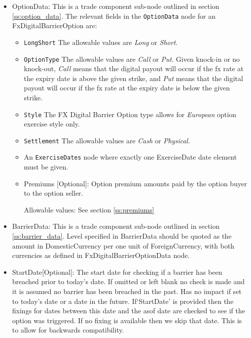 \begin{itemize}

\item OptionData: This is a trade component sub-node outlined in section \ref{ss:option_data}. 
The relevant fields in the \lstinline!OptionData! node for an FxDigitalBarrierOption are:

\begin{itemize}
\item \lstinline!LongShort! The allowable values are \emph{Long} or \emph{Short}.

\item \lstinline!OptionType! The allowable values are \emph{Call} or \emph{Put}. Given knock-in or no knock-out,  \emph{Call} means that the digital payout will occur if the fx rate at the expiry date is above the given strike, and \emph{Put} means that the digital payout will occur if the fx rate at the expiry date is below the given strike.

\item  \lstinline!Style! The FX Digital Barrier Option type allows for \emph{European} option exercise style only.

\item  \lstinline!Settlement! The allowable values are \emph{Cash} or \emph{Physical}.

\item An \lstinline!ExerciseDates! node where exactly one ExerciseDate date element must be given.

\item Premiums [Optional]: Option premium amounts paid by the option buyer to the option seller.

Allowable values:  See section \ref{ss:premiums}

\end{itemize}

\item BarrierData: This is a trade component sub-node outlined in section \ref{ss:barrier_data}.
Level specified in BarrierData should be quoted as the amount in DomesticCurrency per one unit of ForeignCurrency, with both currencies as defined in FxDigitalBarrierOptionData node.

\item StartDate[Optional]: The start date for checking if a barrier has been breached prior to today's date.  If omitted or left blank no check is made and it is assumed no barrier has been breached in the past. Has no impact if set to today's date or a date in the future. If`StartDate' is provided then the fixings for dates between this date and the asof date are checked to see if the option was triggered. If no fixing is available then we skip that date. This is to allow for backwards compatibility.


\end{itemize}
